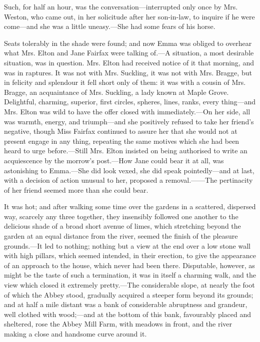 Such, for half an hour, was the conversation---interrupted only once by Mrs. Weston, who came out, in her solicitude after her son-in-law, to inquire if he were come---and she was a little uneasy.---She had some fears of his horse.

Seats tolerably in the shade were found; and now Emma was obliged to overhear what Mrs. Elton and Jane Fairfax were talking of.---A situation, a most desirable situation, was in question. Mrs. Elton had received notice of it that morning, and was in raptures. It was not with Mrs. Suckling, it was not with Mrs. Bragge, but in felicity and splendour it fell short only of them: it was with a cousin of Mrs. Bragge, an acquaintance of Mrs. Suckling, a lady known at Maple Grove. Delightful, charming, superior, first circles, spheres, lines, ranks, every thing---and Mrs. Elton was wild to have the offer closed with immediately.---On her side, all was warmth, energy, and triumph---and she positively refused to take her friend's negative, though Miss Fairfax continued to assure her that she would not at present engage in any thing, repeating the same motives which she had been heard to urge before.---Still Mrs. Elton insisted on being authorised to write an acquiescence by the morrow's post.---How Jane could bear it at all, was astonishing to Emma.---She did look vexed, she did speak pointedly---and at last, with a decision of action unusual to her, proposed a removal.------The pertinacity of her friend seemed more than she could bear.

It was hot; and after walking some time over the gardens in a scattered, dispersed way, scarcely any three together, they insensibly followed one another to the delicious shade of a broad short avenue of limes, which stretching beyond the garden at an equal distance from the river, seemed the finish of the pleasure grounds.---It led to nothing; nothing but a view at the end over a low stone wall with high pillars, which seemed intended, in their erection, to give the appearance of an approach to the house, which never had been there. Disputable, however, as might be the taste of such a termination, it was in itself a charming walk, and the view which closed it extremely pretty.---The considerable slope, at nearly the foot of which the Abbey stood, gradually acquired a steeper form beyond its grounds; and at half a mile distant was a bank of considerable abruptness and grandeur, well clothed with wood;---and at the bottom of this bank, favourably placed and sheltered, rose the Abbey Mill Farm, with meadows in front, and the river making a close and handsome curve around it.

